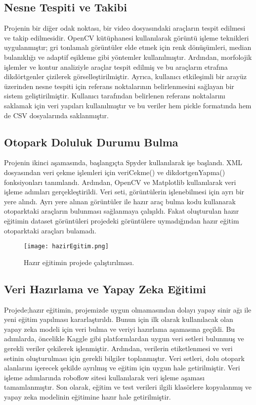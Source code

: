 \documentclass[]{article}
\begin{document}
	\subsection{Nesne Tespiti ve Takibi}
	Projenin bir diğer odak noktası, bir video dosyasındaki araçların tespit edilmesi ve takip edilmesidir. OpenCV kütüphanesi kullanılarak görüntü işleme teknikleri uygulanmıştır; gri tonlamalı görüntüler elde etmek için renk dönüşümleri, median bulanıklığı ve adaptif eşikleme gibi yöntemler kullanılmıştır. Ardından, morfolojik işlemler ve kontur analiziyle araçlar tespit edilmiş ve bu araçların etrafına dikdörtgenler çizilerek görselleştirilmiştir. Ayrıca, kullanıcı etkileşimli bir arayüz üzerinden nesne tespiti için referans noktalarının belirlenmesini sağlayan bir sistem geliştirilmiştir. Kullanıcı tarafından belirlenen referans noktalarını saklamak için veri yapıları kullanılmıştır ve bu veriler hem pickle formatında hem de CSV dosyalarında saklanmıştır\cite{github}.
	
	\subsection{Otopark Doluluk Durumu Bulma}
	Projenin ikinci aşamasında, başlangıçta Spyder kullanılarak işe başlandı. XML dosyasından veri çekme işlemleri için veriCekme() ve dikdortgenYapma() fonksiyonları tanımlandı. Ardından, OpenCV ve Matplotlib kullanılarak veri işleme adımları gerçekleştirildi. Veri seti, görüntülerin işlenebilmesi için ayrı bir yere alındı. Ayrı yere alınan görüntüler ile hazır araç bulma kodu kullanarak otoparktaki araçların bulunması sağlanmaya çalışıldı\cite{basarasizkod}. Fakat oluşturulan hazır eğitimin dataset görüntüleri projedeki görüntülere uymadığından hazır eğitim otoparktaki araçları bulamadı.
	\begin{figure}[!ht]
		\centering
		\texttt{[image: hazirEgitim.png]}
		\caption{Hazır eğitimin projede çalıştırılması.}
	\end{figure}
	
	\subsection{Veri Hazırlama ve Yapay Zeka Eğitimi}
	Projede;hazır eğitimin, projemizde uygun olmamasından dolayı yapay sinir ağı ile yeni eğitim yapılması kararlaştırıldı. Bunun için ilk olarak kullanılacak olan yapay zeka modeli için veri bulma ve veriyi hazırlama aşamasına geçildi. Bu adımlarda, öncelikle Kaggle gibi platformlardan uygun veri setleri bulunmuş ve gerekli veriler çekilerek işlenmiştir\cite{dataset}. Ardından, verilerin etiketlenmesi ve veri setinin oluşturulması için gerekli bilgiler toplanmıştır. Veri setleri, dolu otopark alanlarını içerecek şekilde ayrılmış ve eğitim için uygun hale getirilmiştir. Veri işleme adımlarında roboflow sitesi kullanılarak veri işleme aşaması tamamlanmıştır\cite{roboflow}. Son olarak, eğitim ve test verileri ilgili klasörlere kopyalanmış ve yapay zeka modelinin eğitimine hazır hale getirilmiştir.
	
\end{document}
